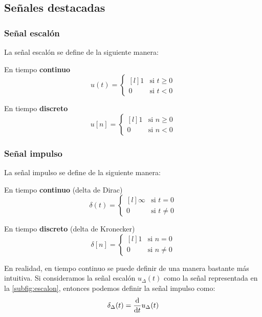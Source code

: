 \documentclass[a4paper]{book}
\begin{document}
\subsection{Señales destacadas}
\subsubsection{Señal escalón}
La señal escalón se define de la siguiente manera:
\begin{multicols}{2}
\centering
En tiempo \textbf{continuo}
\[u(t) = \left\{ \begin{matrix*}[l]
1 & \text{si }t\geq 0 \\[5pt]
0 & \text{si }t <0
\end{matrix*} \right.\]

En tiempo \textbf{discreto}
\[u[n] = \left\{ \begin{matrix*}[l]
1 & \text{si }n\geq 0 \\[5pt]
0 & \text{si }n <0
\end{matrix*} \right.\]
\end{multicols}

\subsubsection{Señal impulso}
La señal impulso se define de la siguiente manera:
\begin{multicols}{2}
\centering
En tiempo \textbf{continuo} (delta de Dirac)
\[\delta (t) = \left\{ \begin{matrix*}[l]
\infty & \text{si }t = 0 \\[5pt]
0 & \text{si }t \not = 0
\end{matrix*} \right.\]

En tiempo \textbf{discreto} (delta de Kronecker)
\[\delta [n] = \left\{ \begin{matrix*}[l]
1 & \text{si }n = 0 \\[5pt]
0 & \text{si }n \not = 0
\end{matrix*} \right.\]
\end{multicols}

En realidad, en tiempo continuo se puede definir de una manera bastante más intuitiva. Si consideramos la señal escalón $u_\Delta (t)$ como la señal representada en la \autoref{subfig:escalon}, entonces podemos definir la señal impulso como: \[\delta _\Delta (t) = \dv{t} u_\Delta (t)\]
\end{document}
